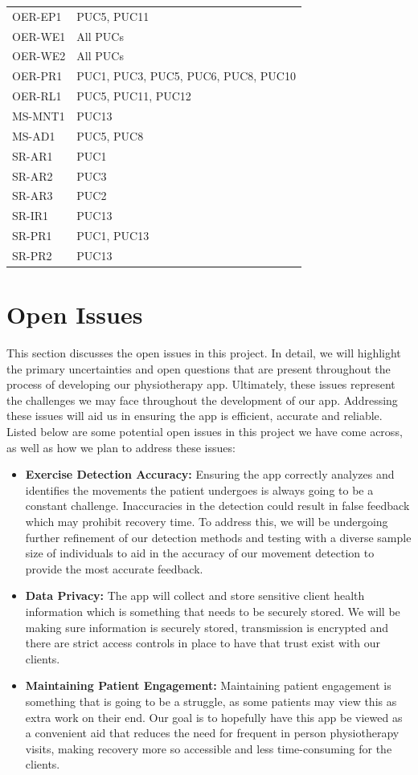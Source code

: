 \documentclass[12pt]{article}
\begin{document}
\begin{longtable}{p{2.5cm}p{11cm}}
    OER-EP1 & PUC5, PUC11 \\
    OER-WE1 & All PUCs \\
    OER-WE2 & All PUCs \\
    OER-PR1 & PUC1, PUC3, PUC5, PUC6, PUC8, PUC10 \\
    OER-RL1 & PUC5, PUC11, PUC12 \\ 
    MS-MNT1 & PUC13 \\
    MS-AD1 & PUC5, PUC8 \\
    SR-AR1 & PUC1 \\
    SR-AR2 & PUC3 \\
    SR-AR3 & PUC2 \\
    SR-IR1 & PUC13 \\
    SR-PR1 & PUC1, PUC13 \\
    SR-PR2 & PUC13 \\


\end{longtable}


\section{Open Issues}

This section discusses the open issues in this project. In detail, we will highlight the primary uncertainties and 
open questions that are present throughout the process of developing our physiotherapy app. Ultimately, these issues 
represent the challenges we may face throughout the development of our app. Addressing these issues will aid us in ensuring 
the app is efficient, accurate and reliable. Listed below are some potential open issues in this project we have come across, 
as well as how we plan to address these issues:

\begin{itemize}
  \item \textbf{Exercise Detection Accuracy:} Ensuring the app correctly analyzes and identifies the movements the patient 
  undergoes is always going to be a constant challenge. Inaccuracies in the detection could result in false feedback which may 
  prohibit recovery time. To address this, we will be undergoing further refinement of our detection methods and testing with a 
  diverse sample size of individuals to aid in the accuracy of our movement detection to provide the most accurate feedback.
  \item \textbf{Data Privacy:} The app will collect and store sensitive client health information which is something that needs to 
  be securely stored. We will be making sure information is securely stored, transmission is encrypted and there are strict access 
  controls in place to have that trust exist with our clients.
  \item \textbf{Maintaining Patient Engagement:} Maintaining patient engagement is something that is going to be a struggle, as some
   patients may view this as extra work on their end. Our goal is to hopefully have this app be viewed as a convenient aid that 
   reduces the need for frequent in person physiotherapy visits, making recovery more so accessible and less time-consuming for 
   the clients. 
\end{itemize}
\end{document}
